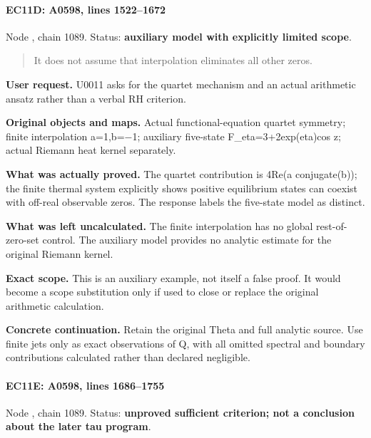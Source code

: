 \paragraph{EC11D: A0598, lines
1522--1672}\label{ec11d-a0598-lines-15221672}

Node \protect{}, chain 1089.
Status: \textbf{auxiliary model with explicitly limited scope}.

\begin{quote}
It does not assume that interpolation eliminates all other zeros.
\end{quote}

\textbf{User request.} U0011 asks for the quartet mechanism and an
actual arithmetic ansatz rather than a verbal RH criterion.

\textbf{Original objects and maps.} Actual functional-equation quartet
symmetry; finite interpolation
a=1,b=\allowbreak{}\ensuremath{−}\allowbreak{}1; auxiliary five-state
F\_eta=3+2exp(eta)cos z; actual Riemann heat kernel separately.

\textbf{What was actually proved.} The quartet contribution is 4Re(a
conjugate(b)); the finite thermal system explicitly shows positive
equilibrium states can coexist with off-real observable zeros. The
response labels the five-state model as distinct.

\textbf{What was left uncalculated.} The finite interpolation has no
global rest-of-zero-set control. The auxiliary model provides no
analytic estimate for the original Riemann kernel.

\textbf{Exact scope.} This is an auxiliary example, not itself a false
proof. It would become a scope substitution only if used to close or
replace the original arithmetic calculation.

\textbf{Concrete continuation.} Retain the original Theta and full
analytic source. Use finite jets only as exact observations of Q, with
all omitted spectral and boundary contributions calculated rather than
declared negligible.

\paragraph{EC11E: A0598, lines
1686--1755}\label{ec11e-a0598-lines-16861755}

Node \protect{}, chain 1089.
Status: \textbf{unproved sufficient criterion; not a conclusion about
the later tau program}.

